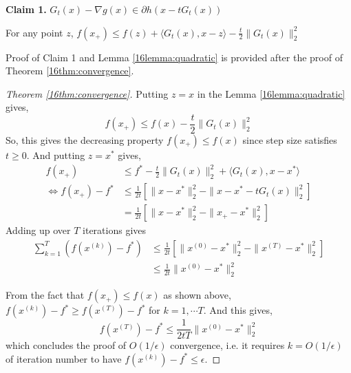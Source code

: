 \documentclass[12pt]{report}
\begin{document}
\noindent\textbf{Claim 1.} $G_t (x)- \nabla g(x) \in \partial h(x-tG_t (x))$

\begin{lemma}
\label{16lemma:quadratic} 
For any point $z$, $f(x_+)\leq f(z)+ \langle G_t (x),x-z \rangle -\frac{t}{2}\|G_t (x)\|_2^2 $
\end{lemma}
Proof of Claim 1 and Lemma \ref{16lemma:quadratic} is provided after the proof of Theorem \ref{16thm:convergence}.

\begin{proof}[Theorem \ref{16thm:convergence}]
Putting $z=x$ in the Lemma \ref{16lemma:quadratic} gives,
\begin{equation*}
f(x_+) \leq f(x)-\frac{t}{2}\|G_t (x)\|_2^2
\end{equation*}
So, this gives the decreasing property $f(x_+) \leq f(x)$ since step size satisfies $t \geq 0$. 
And putting $z=x^*$ gives,
\begin{align*}
f(x_+) &\leq f^*-\frac{t}{2}\|G_t (x)\|_2^2+\langle G_t (x),x-x^* \rangle\\
\Leftrightarrow f(x_+)-f^* &\leq \frac{1}{2t}\left[ \|x-x^* \|_2^2 - \|x-x^*-tG_t(x)\|_2^2 \right]\\
&=\frac{1}{2t}\left[ \|x-x^* \|_2^2 - \|x_+ -x^*\|_2^2 \right]
\end{align*}
Adding up over $T$ iterations gives
\begin{align*}
\sum_{k=1}^{T}\left(f(x^{(k)})-f^* \right) &\leq \frac{1}{2t} \left[\|x^{(0)}-x^*\|_2^2 - \|x^{(T)}-x^*\|_2^2\right] \\
&\leq \frac{1}{2t}\|x^{(0)}-x^*\|_2^2
\end{align*}

From the fact that $f(x_+) \leq f(x)$ as shown above, $f(x^{(k)})-f^* \geq f(x^{(T)})-f^*$ for $k=1,\cdots T$. And this gives,
\begin{equation*}
f(x^{(T)})-f^* \leq \frac{1}{2tT} \|x^{(0)}-x^*\|_2^2
\end{equation*}
which concludes the proof of $O(1/\epsilon)$ convergence, i.e. it requires $k= O(1/\epsilon)$ of iteration number to have $f(x^{(k)})-f^* \leq \epsilon$.

\end{proof}
\end{document}

